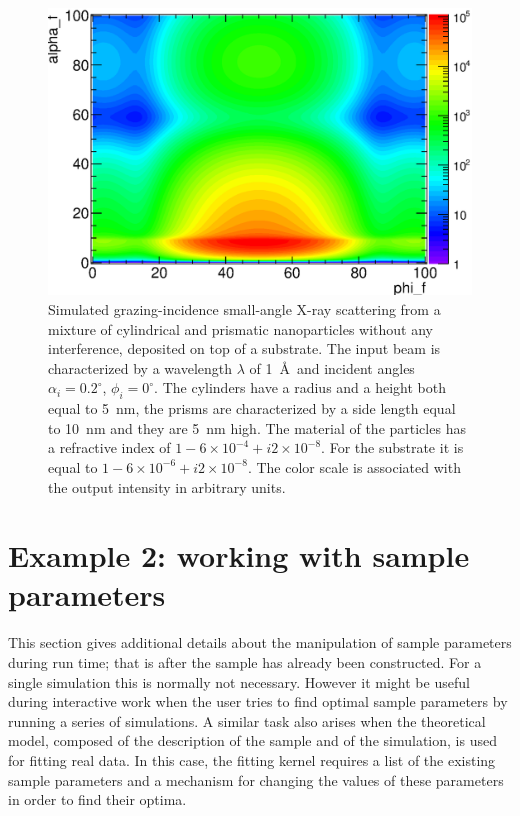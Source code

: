 \begin{figure}[htbp]
  \begin{center}
   \includegraphics[clip=true, width=120mm]{fig/gisasmap/Manual_ex1.eps}
  \end{center}
  \caption[Example 1: Simulated grazing-incidence small-angle X-ray scattering from a mixture of
cylindrical and prismatic nanoparticles without any interference, deposited on top
of a substrate]{Simulated grazing-incidence small-angle X-ray scattering from a mixture of
cylindrical and prismatic nanoparticles without any interference, deposited on top
of a substrate. The input beam is characterized by a wavelength
$\lambda$ of 1~\AA\ and incident angles $\alpha_i=0.2^{\circ}$, $\phi_i=0^{\circ}$. The
cylinders have a radius and a height both equal to 5~nm, the prisms
are characterized by a side length equal to 10~nm and they are 5~nm high. The
material of the particles has a refractive index of $1-6\times 10^{-4}+i2\times 10^{-8}$. For the substrate
it is equal to $1-6\times 10^{-6} +i2\times 10^{-8} $. The color scale
is associated with the output intensity in arbitrary units. }
\label{fig:output_ex1}
\end{figure}


\section{Example 2: working with sample parameters}

This section gives additional details about the manipulation of sample parameters
during run time; that is after the sample has already been constructed. 
For a single simulation this is normally not necessary. However it might be useful
during interactive work when the user tries to find optimal sample parameters by
running a series of simulations.
A similar task also arises when the theoretical model, composed of the
description of the sample and of the simulation, is used for fitting real data.
In this case, the fitting kernel requires a list of the existing sample parameters
and a mechanism for changing the values of these parameters in order to find 
their optima.

